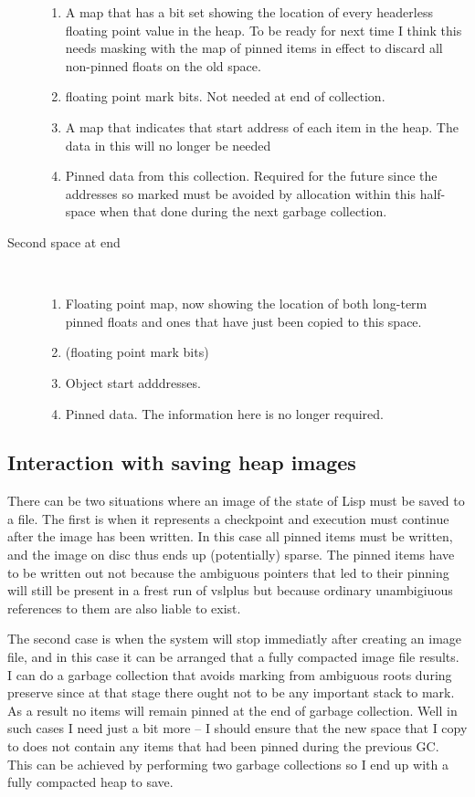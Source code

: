 \begin{description}
\begin{enumerate}
\item A map that has a bit set showing the location of every
headerless floating point value in the heap. To be ready for next
time I think this needs masking with the map of pinned items in effect
to discard all non-pinned floats on the old space.
\item floating point mark bits. Not needed at end of collection.
\item A map that indicates that start address of each item in the heap.
The data in this will no longer be needed
\item Pinned data from this collection. Required for the future since
the addresses so marked must be avoided by allocation within this
half-space when that done during the next garbage collection.
\end{enumerate}
\item[Second space at end]
~

\begin{enumerate}
\item Floating point map, now showing the location of both long-term
pinned floats and ones that have just been copied to this space.
\item (floating point mark bits)
\item Object start adddresses.
\item Pinned data. The information here is no longer required. 
\end{enumerate}
\end{description}

\subsection{Interaction with saving heap images}
There can be two situations where an image of the state of Lisp must be
saved to a file. The first is when it represents a checkpoint and
execution must continue after the image has been written. In this case
all pinned items must be written, and the image on disc thus ends up
(potentially) sparse. The pinned items have to be written out not because
the ambiguous pointers that led to their pinning will still be present
in a frest run of {\tx vslplus} but because ordinary unambigiuous references
to them are also liable to exist.

The second case is when the system will stop immediatly after creating
an image file, and in this case it can be arranged that a fully compacted
image file results.
I can do a garbage collection that avoids marking from
ambiguous roots during {\tx preserve} since
at that stage there ought not to be any important stack to mark. As a result
no items will remain pinned at the end of garbage collection.
Well in such cases I need just
a bit more -- I should ensure that the new space that I copy to does not
contain any items that had been pinned during the previous GC.
This can be achieved by performing two garbage
collections so I end up with a fully compacted heap to save.

